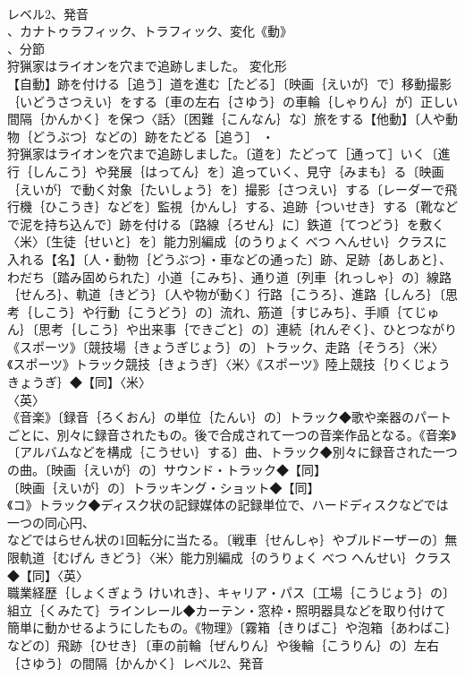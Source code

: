 \documentclass[8pt]{extreport}
\begin{document}
\begin{CJK}{UTF8}{min}
\\	レベル2、発音
\\	、カナトゥラフィック、トラフィック、変化《動》
\\	、分節
\\	狩猟家はライオンを穴まで追跡しました。	変化形 
\\	【自動】跡を付ける［追う］道を進む［たどる］〔映画｛えいが｝で〕移動撮影｛いどうさつえい｝をする〔車の左右｛さゆう｝の車輪｛しゃりん｝が〕正しい間隔｛かんかく｝を保つ〈話〉〔困難｛こんなん｝な〕旅をする【他動】〔人や動物｛どうぶつ｝などの〕跡をたどる［追う］ ・
\\	狩猟家はライオンを穴まで追跡しました。〔道を〕たどって［通って］いく〔進行｛しんこう｝や発展｛はってん｝を〕追っていく、見守｛みまも｝る〔映画｛えいが｝で動く対象｛たいしょう｝を〕撮影｛さつえい｝する〔レーダーで飛行機｛ひこうき｝などを〕監視｛かんし｝する、追跡｛ついせき｝する〔靴などで泥を持ち込んで〕跡を付ける〔路線｛ろせん｝に〕鉄道｛てつどう｝を敷く〈米〉〔生徒｛せいと｝を〕能力別編成｛のうりょく べつ へんせい｝クラスに入れる【名】〔人・動物｛どうぶつ｝・車などの通った〕跡、足跡｛あしあと｝、わだち〔踏み固められた〕小道｛こみち｝、通り道〔列車｛れっしゃ｝の〕線路｛せんろ｝、軌道｛きどう｝〔人や物が動く〕行路｛こうろ｝、進路｛しんろ｝〔思考｛しこう｝や行動｛こうどう｝の〕流れ、筋道｛すじみち｝、手順｛てじゅん｝〔思考｛しこう｝や出来事｛できごと｝の〕連続｛れんぞく｝、ひとつながり《スポーツ》〔競技場｛きょうぎじょう｝の〕トラック、走路｛そうろ｝〈米〉《スポーツ》トラック競技｛きょうぎ｝〈米〉《スポーツ》陸上競技｛りくじょう きょうぎ｝◆【同】〈米〉
\\	〈英〉
\\	《音楽》〔録音｛ろくおん｝の単位｛たんい｝の〕トラック◆歌や楽器のパートごとに、別々に録音されたもの。後で合成されて一つの音楽作品となる。《音楽》〔アルバムなどを構成｛こうせい｝する〕曲、トラック◆別々に録音された一つの曲。〔映画｛えいが｝の〕サウンド・トラック◆【同】
\\	〔映画｛えいが｝の〕トラッキング・ショット◆【同】
\\	《コ》トラック◆ディスク状の記録媒体の記録単位で、ハードディスクなどでは一つの同心円、
\\	などではらせん状の1回転分に当たる。〔戦車｛せんしゃ｝やブルドーザーの〕無限軌道｛むげん きどう｝〈米〉能力別編成｛のうりょく べつ へんせい｝クラス◆【同】〈英〉
\\	職業経歴｛しょくぎょう けいれき｝、キャリア・パス〔工場｛こうじょう｝の〕組立｛くみたて｝ラインレール◆カーテン・窓枠・照明器具などを取り付けて簡単に動かせるようにしたもの。《物理》〔霧箱｛きりばこ｝や泡箱｛あわばこ｝などの〕飛跡｛ひせき｝〔車の前輪｛ぜんりん｝や後輪｛こうりん｝の〕左右｛さゆう｝の間隔｛かんかく｝レベル2、発音

\end{CJK}
\end{document}
